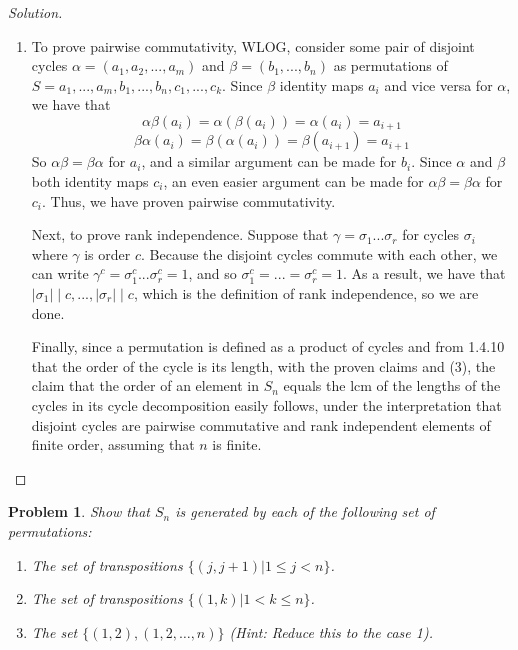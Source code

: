 \documentclass[11 pt]{article}
\newtheorem{Prob}{Problem}
\theoremstyle{definition}
\theoremstyle{remark}
\newenvironment{solution}
  {\renewcommand\qedsymbol{$\blacksquare$}\begin{proof}[Solution]}
  {\end{proof}}
\begin{document}
\begin{solution}
\begin{enumerate}
\item 

To prove pairwise commutativity, WLOG, consider some pair of disjoint cycles $\alpha = (a_1, a_2,...,a_m)$ and $\beta = (b_1,...,b_n)$ as permutations of $S = {a_1,...,a_m,b_1,...,b_n,c_1,...,c_k}$. Since $\beta$ identity maps $a_i$ and vice versa for $\alpha$, we have that 
$$\alpha\beta(a_i) = \alpha(\beta(a_i)) = \alpha(a_i) = a_{i+1}$$
$$\beta\alpha(a_i) = \beta(\alpha(a_i)) = \beta(a_{i+1}) = a_{i+1}$$
So $\alpha\beta = \beta\alpha$ for $a_i$, and a similar argument can be made for $b_i$. Since $\alpha$ and $\beta$ both identity maps $c_i$, an even easier argument can be made for $\alpha\beta = \beta\alpha$ for $c_i$. Thus, we have proven pairwise commutativity.

Next, to prove rank independence. Suppose that $\gamma=\sigma_1...\sigma_r$ for cycles $\sigma_i$ where $\gamma$ is order $c$. Because the disjoint cycles commute with each other, we can write $\gamma^c = \sigma_1^{c}...\sigma_r^{c} = 1$, and so $\sigma_1^{c} = ... = \sigma_r^{c} = 1$. As a result, we have that $|\sigma_1| \mid c,...,|\sigma_r| \mid c$, which is the definition of rank independence, so we are done.

Finally, since a permutation is defined as a product of cycles and from 1.4.10 that the order of the cycle is its length, with the proven claims and (3), the claim that the order of an element in $S_n$ equals the lcm of the lengths of the cycles in its cycle decomposition easily follows, under the interpretation that disjoint cycles are pairwise commutative and rank independent elements of finite order, assuming that $n$ is finite.

\end{enumerate}
\end{solution}

\begin{Prob}
	Show that $S_n$ is generated by each of the following set of permutations:
	\begin{enumerate}
		\item The set of transpositions $\{(j, j+1)|1\leq j<n\}$.
		\item The set of transpositions $\{(1,k)|1<k\leq n\}$.
		\item The set $\{(1,2),(1,2,\dots,n)\}$ (Hint: Reduce this to the case 1).
	\end{enumerate}
\end{Prob}
\end{document}
